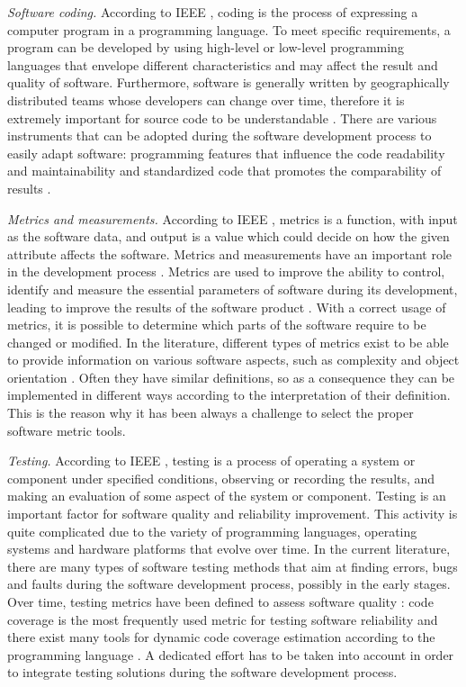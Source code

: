 \documentclass[journal]{IEEEtran}
\begin{document}
\emph{Software coding.} According to IEEE \cite{radatz}, coding is the process of expressing a computer
program in a programming language. To meet specific requirements, a program can be developed by using
high-level or low-level programming languages that envelope different characteristics and may affect the
result and quality of software. Furthermore, software is generally written by geographically distributed
teams whose developers can change over time, therefore it is extremely important for source code to be
understandable \cite{tashtoush}. There are various instruments that can be adopted during the software
development process to easily adapt software: programming features that influence the
code readability and maintainability \cite{buse} and standardized code that promotes the comparability of results \cite{baggen}.

\emph{Metrics and measurements.} According to IEEE \cite{radatz}, metrics is a function, with input as
the software data, and output is a value which could decide on how the given attribute affects the software.
Metrics and measurements have an important role in the development process \cite{fenton, capers}. Metrics
are used to improve the ability to control, identify and measure the essential parameters of software
during its development, leading to improve the results of the software product \cite{goodman}. With a correct
usage of metrics, it is possible to determine which parts of the software require to be changed or modified.
In the literature, different types of metrics exist to be able to provide information on various software
aspects, such as complexity \cite{mccabe} and object orientation \cite{chidamber, lorenz}. Often they have
similar definitions, so as a consequence they can be implemented in different ways according to the
interpretation of their definition. This is the reason why it has been always a challenge to select the
proper software metric tools.

\emph{Testing.} According to IEEE \cite{radatz}, testing is a process of operating a system or component
under specified conditions, observing or recording the results, and making an evaluation of some aspect of
the system or component. Testing is an important factor for software quality and reliability improvement. This
activity is quite complicated due to the variety of programming languages, operating systems and hardware
platforms that evolve over time. In the current literature, there are many types of software
testing methods \cite{myers} that aim at finding errors, bugs and faults during the software development
process, possibly in the early stages. Over time, testing metrics have been defined to assess software
quality \cite{athanasiou}: code coverage is the most frequently used metric for testing software reliability
and there exist many tools for dynamic code coverage estimation according to the programming language
\cite{horgan}. A dedicated effort has to be taken into account in order to integrate testing solutions
during the software development process.
\end{document}
